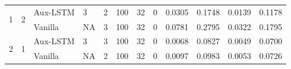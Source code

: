 \begin{table}
{\begin{tabular}{|llllllllllll|}
\multirow{2}{*}{1} & \multirow{2}{*}{2} & Aux-LSTM      & 3                                                               & 2                                                               & 100            & 32                                                             & 0                & 0.0305                                                                    & 0.1748                                                                                        & 0.0139                                                               & 0.1178                                                              \\
                   &                    & Vanilla       & NA                                                              & 3                                                               & 100            & 32                                                             & 0                & 0.0781                                                                    & 0.2795                                                                                        & 0.0322                                                               & 0.1795                                                              \\ \hline
\multirow{2}{*}{2} & \multirow{2}{*}{1} & Aux-LSTM      & 3                                                               & 3                                                               & 100            & 32                                                             & 0                & 0.0068                                                                    & 0.0827                                                                                        & 0.0049                                                               & 0.0700                                                              \\
                   &                    & Vanilla       & NA                                                              & 2                                                               & 100            & 32                                                             & 0                & 0.0097                                                                    & 0.0983                                                                                        & 0.0053                                                               & 0.0726                                                              \\ \hline
\end{tabular}}
\end{table}
